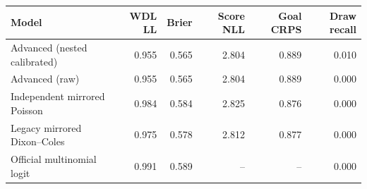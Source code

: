 \begin{tabularx}{\linewidth}{@{}Yrrrrr@{}}
\toprule
Model & WDL LL & Brier & Score NLL & Goal CRPS & Draw recall \\
\midrule
Advanced (nested calibrated) & 0.955 & 0.565 & 2.804 & 0.889 & 0.010 \\
Advanced (raw) & 0.955 & 0.565 & 2.804 & 0.889 & 0.000 \\
Independent mirrored Poisson & 0.984 & 0.584 & 2.825 & 0.876 & 0.000 \\
Legacy mirrored Dixon--Coles & 0.975 & 0.578 & 2.812 & 0.877 & 0.000 \\
Official multinomial logit & 0.991 & 0.589 & -- & -- & 0.000 \\
\bottomrule
\end{tabularx}
